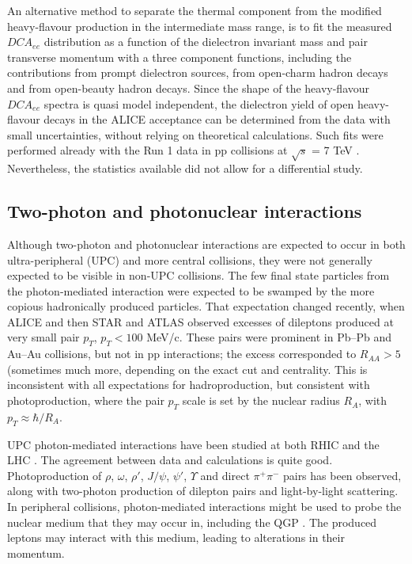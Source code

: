 \documentclass[../report.tex]{subfiles}
\begin{document}
An alternative method to separate the thermal component from the modified heavy-flavour production in the intermediate mass range, is to fit the measured $DCA_{ee}$ distribution as a function of the dielectron invariant mass and pair transverse momentum with a three component functions, including the contributions from prompt dielectron sources, from open-charm hadron decays and from open-beauty hadron decays. Since the shape of the heavy-flavour $DCA_{ee}$ spectra is quasi model independent, the dielectron yield of open heavy-flavour decays in the ALICE acceptance can be determined from the data with small uncertainties, without relying on theoretical calculations. Such fits were performed already with the Run 1 data in pp collisions at $\sqrt{s}$ = 7 TeV \cite{pp7TeV}. Nevertheless, the statistics available did not allow for a differential study.    



\newpage
\subsection{Two-photon and photonuclear interactions}
\label{sec:dileptons:peripheral}

Although two-photon and photonuclear interactions are expected to occur in both ultra-peripheral (UPC) and more central collisions, they were not generally expected to be visible in non-UPC collisions.  The few final state particles from the photon-mediated interaction were expected to be swamped by the more copious hadronically produced particles.   That expectation changed recently, when ALICE \cite{Adam:2015gba} and then STAR \cite{Adam:2018tdm,Zha:2018ohg} and ATLAS \cite{Aaron} observed excesses of dileptons produced at very small pair $p_T$, $p_T < 100$ MeV/c.   These pairs were prominent in Pb--Pb and Au--Au collisions, but not in pp interactions; the excess corresponded to $R_{AA} >5$ (sometimes much more, depending on the exact cut and centrality.  This is inconsistent with all expectations for hadroproduction, but  consistent with photoproduction, where the pair $p_T$ scale is set by the nuclear radius $R_A$, with $p_T \approx \hbar/R_A$. 

UPC photon-mediated interactions have been studied at both RHIC and the LHC \cite{Baltz:2007kq,Bertulani:2005ru,Klein:2017nqo,Bertulani:1987tz,Baur:2001jj}.  The agreement between data and calculations is quite good.  Photoproduction of $\rho$, $\omega$, $\rho'$, $J/\psi$, $\psi'$,  $\Upsilon$ and direct $\pi^+\pi^-$ pairs has been observed, along with two-photon production of dilepton pairs and light-by-light scattering.  In peripheral collisions, photon-mediated interactions might be used to probe the nuclear medium that they may occur in, including the QGP \cite{Aaron,Adam:2018tdm}.   The produced leptons may interact with this medium, leading to alterations in their momentum.    
\end{document}
